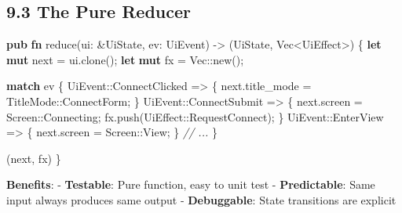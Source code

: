 \documentclass[
]{book}
\newenvironment{Shaded}{}{}
\newcommand{\CommentTok}[1]{\textcolor[rgb]{0.38,0.63,0.69}{\textit{#1}}}
\newcommand{\ControlFlowTok}[1]{\textcolor[rgb]{0.00,0.44,0.13}{\textbf{#1}}}
\newcommand{\DataTypeTok}[1]{\textcolor[rgb]{0.56,0.13,0.00}{#1}}
\newcommand{\KeywordTok}[1]{\textcolor[rgb]{0.00,0.44,0.13}{\textbf{#1}}}
\newcommand{\NormalTok}[1]{#1}
\newcommand{\OperatorTok}[1]{\textcolor[rgb]{0.40,0.40,0.40}{#1}}
\newcommand{\PreprocessorTok}[1]{\textcolor[rgb]{0.74,0.48,0.00}{#1}}
\begin{document}
\subsection{9.3 The Pure Reducer}\label{the-pure-reducer}

\begin{Shaded}
\begin{Highlighting}[]
\KeywordTok{pub} \KeywordTok{fn}\NormalTok{ reduce(ui}\OperatorTok{:} \OperatorTok{\&}\NormalTok{UiState}\OperatorTok{,}\NormalTok{ ev}\OperatorTok{:}\NormalTok{ UiEvent) }\OperatorTok{{-}\textgreater{}}\NormalTok{ (UiState}\OperatorTok{,} \DataTypeTok{Vec}\OperatorTok{\textless{}}\NormalTok{UiEffect}\OperatorTok{\textgreater{}}\NormalTok{) }\OperatorTok{\{}
    \KeywordTok{let} \KeywordTok{mut}\NormalTok{ next }\OperatorTok{=}\NormalTok{ ui}\OperatorTok{.}\NormalTok{clone()}\OperatorTok{;}
    \KeywordTok{let} \KeywordTok{mut}\NormalTok{ fx }\OperatorTok{=} \DataTypeTok{Vec}\PreprocessorTok{::}\NormalTok{new()}\OperatorTok{;}

    \ControlFlowTok{match}\NormalTok{ ev }\OperatorTok{\{}
        \PreprocessorTok{UiEvent::}\NormalTok{ConnectClicked }\OperatorTok{=\textgreater{}} \OperatorTok{\{}
\NormalTok{            next}\OperatorTok{.}\NormalTok{title\_mode }\OperatorTok{=} \PreprocessorTok{TitleMode::}\NormalTok{ConnectForm}\OperatorTok{;}
        \OperatorTok{\}}
        \PreprocessorTok{UiEvent::}\NormalTok{ConnectSubmit }\OperatorTok{=\textgreater{}} \OperatorTok{\{}
\NormalTok{            next}\OperatorTok{.}\NormalTok{screen }\OperatorTok{=} \PreprocessorTok{Screen::}\NormalTok{Connecting}\OperatorTok{;}
\NormalTok{            fx}\OperatorTok{.}\NormalTok{push(}\PreprocessorTok{UiEffect::}\NormalTok{RequestConnect)}\OperatorTok{;}
        \OperatorTok{\}}
        \PreprocessorTok{UiEvent::}\NormalTok{EnterView }\OperatorTok{=\textgreater{}} \OperatorTok{\{}
\NormalTok{            next}\OperatorTok{.}\NormalTok{screen }\OperatorTok{=} \PreprocessorTok{Screen::}\NormalTok{View}\OperatorTok{;}
        \OperatorTok{\}}
        \CommentTok{// ...}
    \OperatorTok{\}}

\NormalTok{    (next}\OperatorTok{,}\NormalTok{ fx)}
\OperatorTok{\}}
\end{Highlighting}
\end{Shaded}

\textbf{Benefits}: - \textbf{Testable}: Pure function, easy to unit test
- \textbf{Predictable}: Same input always produces same output -
\textbf{Debuggable}: State transitions are explicit
\end{document}
